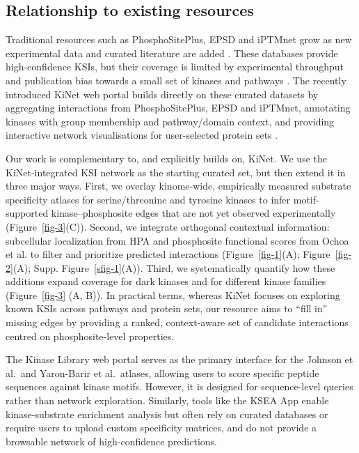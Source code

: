 \documentclass[
  number,
  preprint,
  onecolumn]{elsarticle}
\begin{document}
\subsection{Relationship to existing
resources}\label{relationship-to-existing-resources}

Traditional resources such as PhosphoSitePlus, EPSD and iPTMnet grow as
new experimental data and curated literature are added
\citep{Hornbeck2015-dg, Chen2025-bt, Huang2018-bq}. These databases
provide high-confidence KSIs, but their coverage is limited by
experimental throughput and publication bias towards a small set of
kinases and pathways \citep{Berginski2021-so}. The recently introduced
KiNet web portal builds directly on these curated datasets by
aggregating interactions from PhosphoSitePlus, EPSD and iPTMnet,
annotating kinases with group membership and pathway/domain context, and
providing interactive network visualisations for user-selected protein
sets \citep{Sekar2024-nx}.

Our work is complementary to, and explicitly builds on, KiNet. We use
the KiNet-integrated KSI network as the starting curated set, but then
extend it in three major ways. First, we overlay kinome-wide,
empirically measured substrate specificity atlases for serine/threonine
and tyrosine kinases \citep{Johnson2023-ai, Yaron-Barir2024-lv} to infer
motif-supported kinase--phosphosite edges that are not yet observed
experimentally (Figure~\ref{fig-3}(C)). Second, we integrate orthogonal
contextual information: subcellular localization from HPA
\citep{Thul2017-cl} and phosphosite functional scores from Ochoa et al.
\citep{Ochoa2020-og} to filter and prioritize predicted interactions
(Figure~\ref{fig-1}(A); Figure~\ref{fig-2}(A);
Supp. Figure~\ref{sfig-1}(A)). Third, we systematically quantify how
these additions expand coverage for dark kinases and for different
kinase families (Figure~\ref{fig-3} (A, B)). In practical terms, whereas
KiNet focuses on exploring known KSIs across pathways and protein sets,
our resource aims to ``fill in'' missing edges by providing a ranked,
context-aware set of candidate interactions centred on phosphosite-level
properties.

The Kinase Library web portal \citep{Johnson2023-ai} serves as the
primary interface for the Johnson et al.~and Yaron-Barir et al.~atlases,
allowing users to score specific peptide sequences against kinase
motifs. However, it is designed for sequence-level queries rather than
network exploration. Similarly, tools like the KSEA App enable
kinase-substrate enrichment analysis but often rely on curated databases
or require users to upload custom specificity matrices, and do not
provide a browsable network of high-confidence predictions.
\end{document}
